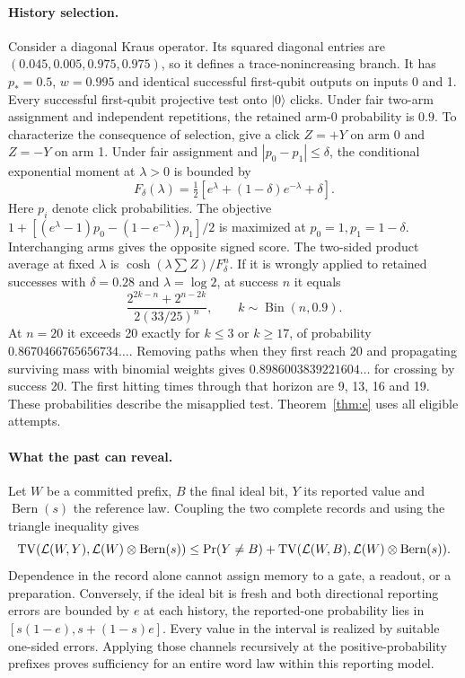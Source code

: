 \documentclass[11pt,letterpaper]{article}
\begin{document}
\paragraph{History selection.}
Consider a diagonal Kraus operator. Its squared diagonal entries are $(0.045,0.005,0.975,0.975)$, so it defines a trace-nonincreasing branch. It has $p_*=0.5$, $w=0.995$ and identical successful first-qubit outputs on inputs 0 and 1. Every successful first-qubit projective test onto $|0\rangle$ clicks. Under fair two-arm assignment and independent repetitions, the retained arm-0 probability is $0.9$. To characterize the consequence of selection, give a click $Z=+Y$ on arm 0 and $Z=-Y$ on arm 1. Under fair assignment and $|p_0-p_1|\le\delta$, the conditional exponential moment at $\lambda>0$ is bounded by
\[
 F_\delta(\lambda)=\tfrac12[e^\lambda+(1-\delta)e^{-\lambda}+\delta].
\]
Here $p_i$ denote click probabilities. The objective $1+[(e^\lambda-1)p_0-(1-e^{-\lambda})p_1]/2$ is maximized at $p_0=1,p_1=1-\delta$. Interchanging arms gives the opposite signed score. The two-sided product average at fixed $\lambda$ is $\cosh(\lambda\sum Z)/F_\delta^n$. If it is wrongly applied to retained successes with $\delta=0.28$ and $\lambda=\log2$, at success $n$ it equals
\[
 \frac{2^{2k-n}+2^{n-2k}}{2(33/25)^n},\qquad k\sim\operatorname{Bin}(n,0.9).
\]
At $n=20$ it exceeds 20 exactly for $k\le3$ or $k\ge17$, of probability $0.8670466765656734\ldots$. Removing paths when they first reach 20 and propagating surviving mass with binomial weights gives $0.8986003839221604\ldots$ for crossing by success 20. The first hitting times through that horizon are 9, 13, 16 and 19. These probabilities describe the misapplied test. Theorem~\ref{thm:e} uses all eligible attempts.

\paragraph{What the past can reveal.}
Let $W$ be a committed prefix, $B$ the final ideal bit, $Y$ its reported value and $\operatorname{Bern}(s)$ the reference law. Coupling the two complete records and using the triangle inequality gives
\[
 \operatorname{TV}(\mathcal L(W,Y),\mathcal L(W)\otimes\operatorname{Bern}(s))
 \le \Pr(Y\ne B)+\operatorname{TV}(\mathcal L(W,B),\mathcal L(W)\otimes\operatorname{Bern}(s)).
\]
Dependence in the record alone cannot assign memory to a gate, a readout, or a preparation. Conversely, if the ideal bit is fresh and both directional reporting errors are bounded by $e$ at each history, the reported-one probability lies in $[s(1-e),s+(1-s)e]$. Every value in the interval is realized by suitable one-sided errors. Applying those channels recursively at the positive-probability prefixes proves sufficiency for an entire word law within this reporting model.
\end{document}
